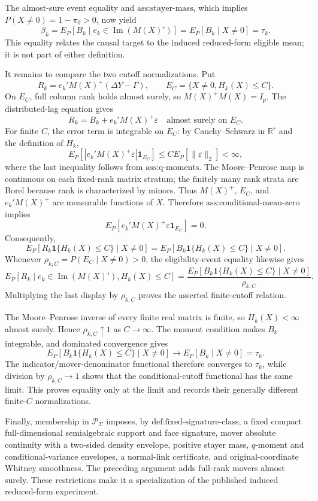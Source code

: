 The almost-sure event equality and \(\text{ass:stayer-mass}\), which implies \(P(X\ne0)=1-\pi_0>0\), now yield
\[
\overline\beta_k
=E_P[B_k\mid e_k\in\operatorname{Im}(M(X)')]
=E_P[B_k\mid X\ne0]
=\tau_k.
\]
This equality relates the causal target to the induced reduced-form eligible mean; it is not part of either definition.

It remains to compare the two cutoff normalizations. Put
\[
R_k=e_k'M(X)^+(\Delta Y-\Gamma),
\qquad
E_C=\{X\ne0,H_k(X)\le C\}.
\]
On \(E_C\), full column rank holds almost surely, so \(M(X)^+M(X)=I_p\). The distributed-lag equation gives
\[
R_k=B_k+e_k'M(X)^+\varepsilon
\quad\text{almost surely on }E_C.
\]
For finite \(C\), the error term is integrable on \(E_C\): by Cauchy--Schwarz in \(\mathbb R^r\) and the definition of \(H_k\),
\[
E_P\!\left[|e_k'M(X)^+\varepsilon|\mathbf 1_{E_C}\right]
\le C E_P[\lVert\varepsilon\rVert_2]<\infty,
\]
where the last inequality follows from \(\text{ass:q-moments}\). The Moore--Penrose map is continuous on each fixed-rank matrix stratum; the finitely many rank strata are Borel because rank is characterized by minors. Thus \(M(X)^+\), \(E_C\), and \(e_k'M(X)^+\) are measurable functions of \(X\). Therefore \(\text{ass:conditional-mean-zero}\) implies
\[
E_P[e_k'M(X)^+\varepsilon\mathbf 1_{E_C}]=0.
\]
Consequently,
\[
E_P[R_k\mathbf 1\{H_k(X)\le C\}\mid X\ne0]
=E_P[B_k\mathbf 1\{H_k(X)\le C\}\mid X\ne0].
\]
Whenever \(\rho_{k,C}=P(E_C\mid X\ne0)>0\), the eligibility-event equality likewise gives
\[
E_P[R_k\mid e_k\in\operatorname{Im}(M(X)'),H_k(X)\le C]
=\frac{E_P[B_k\mathbf 1\{H_k(X)\le C\}\mid X\ne0]}{\rho_{k,C}}.
\]
Multiplying the last display by \(\rho_{k,C}\) proves the asserted finite-cutoff relation.

The Moore--Penrose inverse of every finite real matrix is finite, so \(H_k(X)<\infty\) almost surely. Hence \(\rho_{k,C}\uparrow1\) as \(C\to\infty\). The moment condition makes \(B_k\) integrable, and dominated convergence gives
\[
E_P[B_k\mathbf 1\{H_k(X)\le C\}\mid X\ne0]
\longrightarrow E_P[B_k\mid X\ne0]=\tau_k.
\]
The indicator/mover-denominator functional therefore converges to \(\tau_k\), while division by \(\rho_{k,C}\to1\) shows that the conditional-cutoff functional has the same limit. This proves equality only at the limit and records their generally different finite-\(C\) normalizations.

Finally, membership in \(\mathcal P_\Sigma\) imposes, by \(\text{def:fixed-signature-class}\), a fixed compact full-dimensional semialgebraic support and face signature, mover absolute continuity with a two-sided density envelope, positive stayer mass, \(q\)-moment and conditional-variance envelopes, a normal-link certificate, and original-coordinate Whitney smoothness. The preceding argument adds full-rank movers almost surely. These restrictions make it a specialization of the published induced reduced-form experiment.

